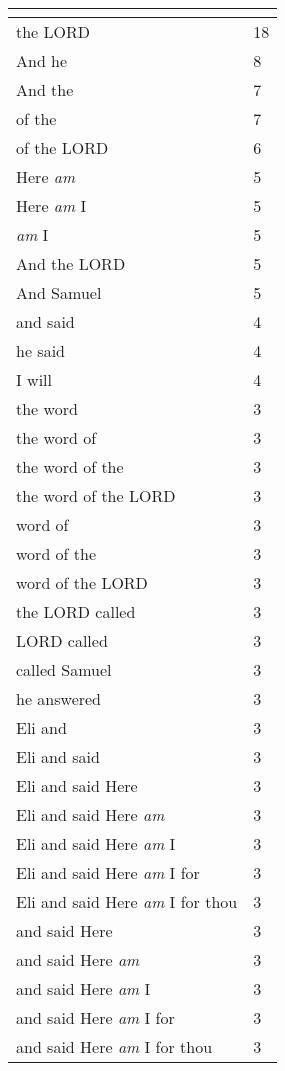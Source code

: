 \begin{center}
\begin{longtable}{|p{3.0in}|p{0.5in}|}
\hline \multicolumn{2}{c}{{ }} \\ \hline
\endfoot 
the LORD & 18\\ \hline 
And he & 8\\ \hline 
And the & 7\\ \hline 
of the & 7\\ \hline 
of the LORD & 6\\ \hline 
Here \emph{am} & 5\\ \hline 
Here \emph{am} I & 5\\ \hline 
\emph{am} I & 5\\ \hline 
And the LORD & 5\\ \hline 
And Samuel & 5\\ \hline 
and said & 4\\ \hline 
he said & 4\\ \hline 
I will & 4\\ \hline 
the word & 3\\ \hline 
the word of & 3\\ \hline 
the word of the & 3\\ \hline 
the word of the LORD & 3\\ \hline 
word of & 3\\ \hline 
word of the & 3\\ \hline 
word of the LORD & 3\\ \hline 
the LORD called & 3\\ \hline 
LORD called & 3\\ \hline 
called Samuel & 3\\ \hline 
he answered & 3\\ \hline 
Eli and & 3\\ \hline 
Eli and said & 3\\ \hline 
Eli and said Here & 3\\ \hline 
Eli and said Here \emph{am} & 3\\ \hline 
Eli and said Here \emph{am} I & 3\\ \hline 
Eli and said Here \emph{am} I for & 3\\ \hline 
Eli and said Here \emph{am} I for thou & 3\\ \hline 
and said Here & 3\\ \hline 
and said Here \emph{am} & 3\\ \hline 
and said Here \emph{am} I & 3\\ \hline 
and said Here \emph{am} I for & 3\\ \hline 
and said Here \emph{am} I for thou & 3\\ \hline 

\end{longtable}
\end{center}
